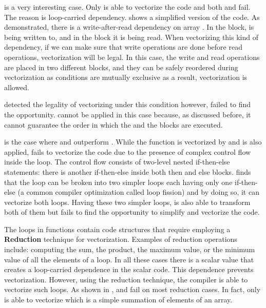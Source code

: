 is a very interesting case. Only \gcc is able to vectorize the code and both \armclang and \ALC fail. The reason is loop-carried dependency.
 shows a simplified version of the code. As demonstrated, there is a write-after-read dependency on array . In the  block,  is being written to, and in the  block  it is being read. When vectorizing this kind of dependency, if we can make sure that write operations are done before read operations, vectorization will be legal. 
In this case,  the write and read operations are placed in two different blocks, and they can be safely reordered during vectorization as conditions are mutually exclusive as a result, vectorization is allowed.


\gcc detected the legality of vectorizing  under this condition however, \armclang failed to find the opportunity. \ALC cannot be applied in this case because, as discussed before, it cannot guarantee the order in which the  and the  blocks are executed.

 is the case where \armclang and \ALC outperform \gcc. While the function is vectorized by \armclang and \ALC is also applied, \gcc fails to vectorize the code due to the presence of complex control flow inside the loop. The control flow consists of two-level nested if-then-else statements: there is another if-then-else inside both then and else blocks.  finds that the loop can be broken into two simpler loops each having only one if-then-else (a common compiler optimization called loop fission) and by doing so, it can vectorize both loops. Having these two simpler loops, \ALC is also able to transform both of them but \gcc fails to find the opportunity to simplify and vectorize the code.

The loops in  functions contain code structures that require employing a \textbf{Reduction} technique for vectorization. 
Examples of reduction operations include: computing the sum, the product, the maximum value, or the minimum value of all the elements of a loop. In all these cases there is a scalar value that creates a loop-carried dependence in the scalar code. This dependence prevents vectorization. However, using the reduction technique, the compiler is able to vectorize such loops. As shown in  \gcc, \armclang and \ALC fail on most reduction cases. In fact, only \gcc is able to vectorize  which is a simple summation of elements of an array.

